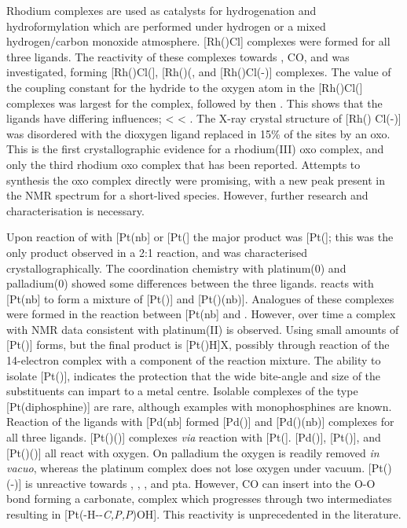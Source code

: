Rhodium complexes are used as catalysts for hydrogenation and hydroformylation which are performed under hydrogen or a mixed hydrogen/carbon monoxide atmosphere.  [Rh(\tBuxantphosk)Cl] complexes were formed for all three \tBuxantphos{} ligands. The reactivity of these complexes towards , CO, and  was investigated, forming [Rh(\tBuxantphosk)Cl(], [Rh(\tBuxantphos)(\ce{CO)2Cl]}, and [Rh(\tBuxantphosk)Cl(-)] complexes. The value of the \JRhH{} coupling constant for the hydride \trans{} to the oxygen atom in the [Rh(\tBuxantphosk)Cl(] complexes was largest for the \tBusixantphos{} complex, followed by \tButhixantphos{} then \tBuxantphos{}.  This shows that the ligands have differing \trans{} influences; \tBusixantphos{} \textless{} \tButhixantphos{} \textless{} \tBuxantphos.  The X-ray crystal structure of [Rh(\tBuxantphosk) Cl(-)] was disordered with the dioxygen ligand replaced in 15\% of the sites by an oxo.  This is the first crystallographic evidence for a rhodium(III) oxo complex, and only the third rhodium oxo complex that has been reported.  Attempts to synthesis the oxo complex directly were promising, with a new peak present in the \phosphorus{} NMR spectrum for a short-lived species.  However, further research and characterisation is necessary.

Upon reaction of \Phthixantphos{} with [Pt(nb] or [Pt(] the major product was [Pt(\Phthixantphos{}]; this was the only product observed in a 2:1 reaction, and was characterised crystallographically.  The coordination chemistry with platinum(0) and palladium(0) showed some differences between the three \tBuxantphos{} ligands.  \tBuThixantphos{} reacts with [Pt(nb] to form a mixture of [Pt(\tButhixantphos)] and [Pt(\tButhixantphos)(nb)].  Analogues of these complexes were formed in the reaction between [Pt(nb] and \tBusixantphos{}.  However, over time a complex with NMR data consistent with platinum(II) is observed.  Using \tBuxantphos{} small amounts of [Pt(\tBuxantphos)] forms, but the final product is [Pt(\tBuxantphos)H]X, possibly through reaction of the 14-electron complex with a component of the reaction mixture.  The ability to isolate [Pt(\tButhixantphos)], indicates the protection that the wide bite-angle and size of the \tBu{} substituents can impart to a metal centre.  Isolable complexes of the type [Pt(diphosphine)] are rare, although examples with monophosphines are known.  Reaction of the \tBuxantphos{} ligands with [Pd(nb] formed [Pd(\tBuxantphos)] and [Pd(\tBuxantphos)(nb)] complexes for all three ligands.  [Pt(\tBuxantphos)()] complexes \emph{via} reaction with [Pt(].  [Pd(\tButhixantphos)], [Pt(\tButhixantphos)], and [Pt(\tButhixantphos)()] all react with oxygen.  On palladium the oxygen is readily removed \emph{in vacuo}, whereas the platinum complex does not lose oxygen under vacuum.  [Pt(\tButhixantphos)(-)] is unreactive towards , , ,  and pta.  However, CO can insert into the O-O bond forming a carbonate, complex which progresses through two intermediates resulting in [Pt(\tButhixantphos-H-\dento{}-\emph{C,P,P}\textprime)OH].  This reactivity is unprecedented in the literature.  

